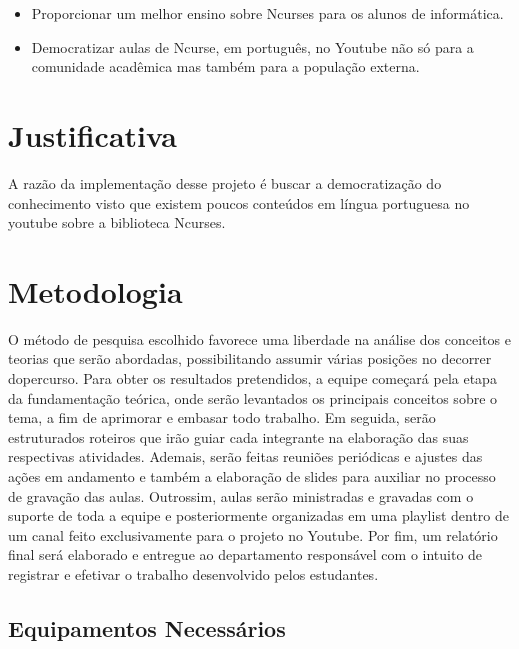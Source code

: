 \documentclass[a4paper,10pt]{article} %
\begin{document}
\begin{itemize}
 \item Proporcionar um melhor ensino sobre Ncurses para os alunos de informática.
 \item Democratizar aulas de Ncurse, em português,  no Youtube não só para a comunidade acadêmica mas também para a população externa.
\end{itemize}


\section{Justificativa}
A razão da implementação desse projeto é buscar a democratização do conhecimento visto que existem poucos conteúdos em língua portuguesa no youtube sobre a biblioteca Ncurses.



\section{Metodologia}
 O método de pesquisa escolhido favorece uma liberdade na análise dos conceitos e teorias que serão abordadas, possibilitando assumir várias posições no decorrer dopercurso. 
 Para obter os resultados pretendidos, a equipe começará pela etapa da fundamentação teórica, onde serão levantados os principais conceitos sobre o tema, a fim de aprimorar e embasar todo trabalho.
 Em seguida, serão estruturados roteiros  que irão guiar cada integrante na elaboração das suas respectivas atividades.
 Ademais,  serão feitas reuniões periódicas e ajustes das ações em andamento e também  a elaboração de slides para auxiliar no processo de gravação das aulas.
 Outrossim, aulas serão ministradas e gravadas com o suporte de toda a  equipe e posteriormente organizadas em uma playlist dentro de um canal feito exclusivamente para o projeto no Youtube.
 Por fim, um relatório final será elaborado e entregue ao departamento responsável com o intuito de registrar e efetivar o trabalho desenvolvido pelos estudantes.

\subsection{Equipamentos Necessários}
\end{document}
